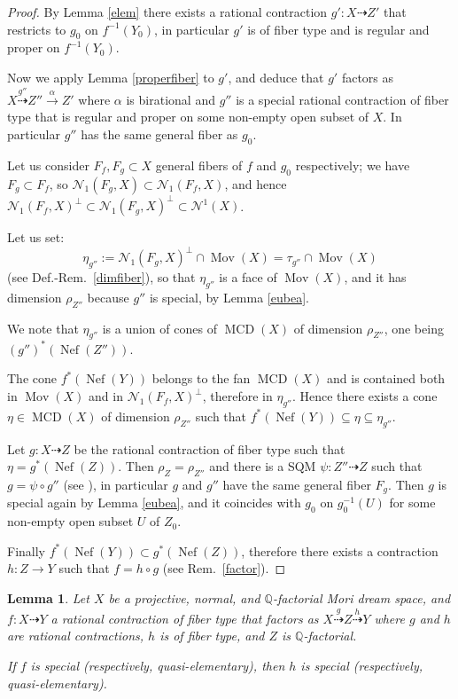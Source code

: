 \documentclass[a4paper,12pt]{amsart}
\newtheorem{lemma}[thm]{Lemma}
\theoremstyle{definition}
\numberwithin{figure}{section}
\numberwithin{table}{section}
\newcommand{\Q}{\mathbb{Q}}
\newcommand{\N}{\mathcal{N}_1}
\newcommand{\Nu}{\mathcal{N}^1}
\newcommand{\Nef}{\operatorname{Nef}}
\newcommand{\Mov}{\operatorname{Mov}}
\newcommand{\MCD}{\operatorname{MCD}}
\begin{document}
\begin{proof}
  By Lemma \ref{elem} there exists a rational contraction $g'\colon X\dasharrow Z'$ that restricts to $g_0$ on $f^{-1}(Y_0)$, in particular $g'$ is of fiber type and  is regular and proper on $f^{-1}(Y_0)$.

  Now we apply Lemma \ref{properfiber} to $g'$, and deduce that
  $g'$ factors as  $X\stackrel{g''}{\dasharrow}Z''\stackrel{\alpha}{\to} Z'$ where
 $\alpha$ is birational and $g''$ is a special rational contraction of fiber type that is regular and  proper on some non-empty open subset of $X$. In particular $g''$ has the same general fiber as $g_0$.
 
Let us consider $F_f,F_g\subset X$ general fibers of $f$ and $g_0$ respectively; we have $F_g\subset F_f$, so $\N(F_g,X)\subset\N(F_f,X)$, and hence
$\N(F_f,X)^{\perp}\subset\N(F_g,X)^{\perp}\subset\Nu(X)$.

 Let us set:
 $$\eta_{g''}:=\N(F_g,X)^{\perp}\cap\Mov(X)=\tau_{g''}\cap\Mov(X)$$
(see Def.-Rem.~\ref{dimfiber}), so that 
 $\eta_{g''}$ is a face of $\Mov(X)$, and it has dimension
 $\rho_{Z''}$ because $g''$ is special, by Lemma \ref{eubea}.

We note that $\eta_{g''}$ is a union of cones of $\MCD(X)$ of dimension $\rho_{Z''}$, one being $(g'')^*(\Nef(Z''))$.

The cone $f^*(\Nef(Y))$ belongs to the fan $\MCD(X)$ and is contained both in $\Mov(X)$ and in $\N(F_f,X)^{\perp}$, therefore 
in $\eta_{g''}$. Hence there exists a cone $\eta\in\MCD(X)$ of dimension $\rho_{Z''}$ such that $f^*(\Nef(Y))\subseteq\eta\subseteq \eta_{g''}$.

Let $g\colon X\dasharrow Z$ be the rational contraction of fiber type such that $\eta=g^*(\Nef(Z))$. Then $\rho_Z=\rho_{Z''}$ and
there is a SQM $\psi\colon Z''\dasharrow Z$ such that $g=\psi\circ g''$
 (see \cite[Th.~1.2]{okawa_MCD}),
in particular $g$ and $g''$ have the same general fiber $F_g$.
 Then $g$ is special again by Lemma \ref{eubea}, and it
 coincides with $g_0$  on
$g_0^{-1}(U)$ for
 some non-empty open subset $U$ of $Z_0$.

Finally $f^*(\Nef(Y))\subset g^*(\Nef(Z))$, therefore there exists a contraction $h\colon Z\to Y$ such that $f=h\circ g$ (see Rem.~\ref{factor}).
\end{proof}  
\begin{lemma}\label{h}
  Let $X$ be a projective, normal, and $\Q$-factorial Mori dream space, and $f\colon X\dasharrow Y$ a rational contraction of fiber type that factors as $X\stackrel{g}{\dasharrow}Z\stackrel{h}{\dasharrow}Y$ where  $g$ and $h$ are rational contractions, $h$ is of fiber type, and $Z$ is $\Q$-factorial.

  If $f$ is special (respectively, quasi-elementary), then $h$ is special (respectively, quasi-elementary).
\end{lemma}
\end{document}

